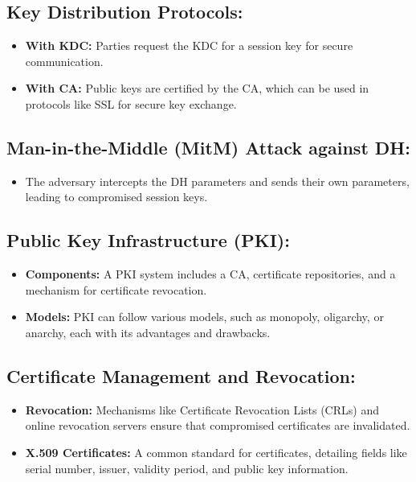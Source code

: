 \documentclass[12pt]{article}
\begin{document}
\subsection*{Key Distribution Protocols:}
\begin{itemize}
    \item \textbf{With KDC:} Parties request the KDC for a session key for secure communication.
    \item \textbf{With CA:} Public keys are certified by the CA, which can be used in protocols like SSL for secure key exchange.
\end{itemize}

\subsection*{Man-in-the-Middle (MitM) Attack against DH:}
\begin{itemize}
    \item The adversary intercepts the DH parameters and sends their own parameters, leading to compromised session keys.
\end{itemize}

\subsection*{Public Key Infrastructure (PKI):}
\begin{itemize}
    \item \textbf{Components:} A PKI system includes a CA, certificate repositories, and a mechanism for certificate revocation.
    \item \textbf{Models:} PKI can follow various models, such as monopoly, oligarchy, or anarchy, each with its advantages and drawbacks.
\end{itemize}

\subsection*{Certificate Management and Revocation:}
\begin{itemize}
    \item \textbf{Revocation:} Mechanisms like Certificate Revocation Lists (CRLs) and online revocation servers ensure that compromised certificates are invalidated.
    \item \textbf{X.509 Certificates:} A common standard for certificates, detailing fields like serial number, issuer, validity period, and public key information.
\end{itemize}
\end{document}
